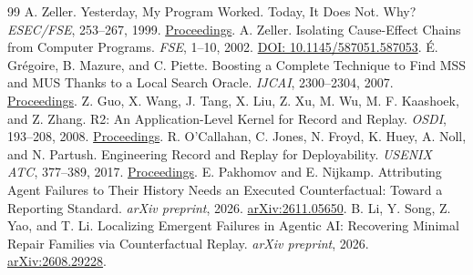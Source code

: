 \documentclass[11pt,letterpaper]{article}
\begin{document}
\begin{thebibliography}{99}
 A. Zeller. Yesterday, My Program Worked. Today, It Does Not. Why? \emph{ESEC/FSE}, 253--267, 1999. \href{https://doi.org/10.1007/3-540-48166-4_16}{Proceedings}.
 A. Zeller. Isolating Cause-Effect Chains from Computer Programs. \emph{FSE}, 1--10, 2002. \href{https://doi.org/10.1145/587051.587053}{DOI: 10.1145/587051.587053}.
 É. Grégoire, B. Mazure, and C. Piette. Boosting a Complete Technique to Find MSS and MUS Thanks to a Local Search Oracle. \emph{IJCAI}, 2300--2304, 2007. \href{https://ijcai.org/proceedings/2007/370}{Proceedings}.
 Z. Guo, X. Wang, J. Tang, X. Liu, Z. Xu, M. Wu, M. F. Kaashoek, and Z. Zhang. R2: An Application-Level Kernel for Record and Replay. \emph{OSDI}, 193--208, 2008. \href{https://www.usenix.org/legacy/event/osdi08/tech/full_papers/guo/guo.pdf}{Proceedings}.
 R. O'Callahan, C. Jones, N. Froyd, K. Huey, A. Noll, and N. Partush. Engineering Record and Replay for Deployability. \emph{USENIX ATC}, 377--389, 2017. \href{https://www.usenix.org/conference/atc17/technical-sessions/presentation/ocallahan}{Proceedings}.
 E. Pakhomov and E. Nijkamp. Attributing Agent Failures to Their History Needs an Executed Counterfactual: Toward a Reporting Standard. \emph{arXiv preprint}, 2026. \href{https://arxiv.org/abs/2611.05650}{arXiv:2611.05650}.
 B. Li, Y. Song, Z. Yao, and T. Li. Localizing Emergent Failures in Agentic AI: Recovering Minimal Repair Families via Counterfactual Replay. \emph{arXiv preprint}, 2026. \href{https://arxiv.org/abs/2608.29228}{arXiv:2608.29228}.
\end{thebibliography}
\end{document}
